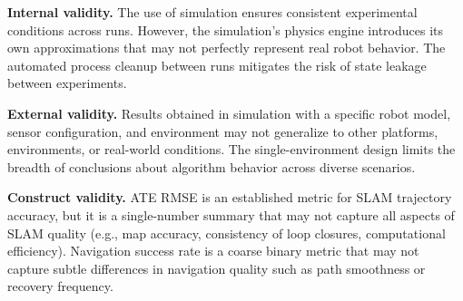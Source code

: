 \textbf{Internal validity.} The use of simulation ensures consistent experimental conditions across runs. However, the simulation's physics engine introduces its own approximations that may not perfectly represent real robot behavior. The automated process cleanup between runs mitigates the risk of state leakage between experiments.

\textbf{External validity.} Results obtained in simulation with a specific robot model, sensor configuration, and environment may not generalize to other platforms, environments, or real-world conditions. The single-environment design limits the breadth of conclusions about algorithm behavior across diverse scenarios.

\textbf{Construct validity.} ATE RMSE is an established metric for SLAM trajectory accuracy, but it is a single-number summary that may not capture all aspects of SLAM quality (e.g., map accuracy, consistency of loop closures, computational efficiency). Navigation success rate is a coarse binary metric that may not capture subtle differences in navigation quality such as path smoothness or recovery frequency.
